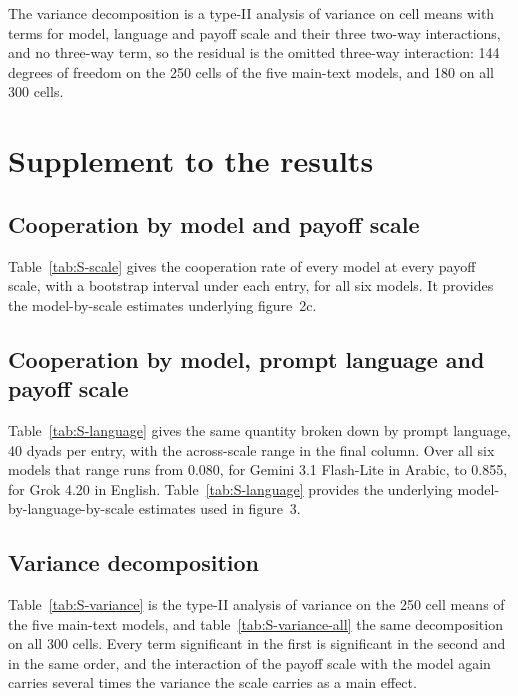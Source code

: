 \documentclass[11pt,a4paper]{article}
\begin{document}
The variance decomposition is a type-II analysis of variance on cell means with terms for model, language and payoff scale and their three two-way interactions, and no three-way term, so the residual is the omitted three-way interaction: 144 degrees of freedom on the 250 cells of the five main-text models, and 180 on all 300 cells.


\section{Supplement to the results}\label{appendix:results}

\subsection{Cooperation by model and payoff scale}\label{appendix:by_scale}

Table~\ref{tab:S-scale} gives the cooperation rate of every model at every payoff scale, with a bootstrap interval under each entry, for all six models. It provides the model-by-scale estimates underlying figure~2c.

\subsection{Cooperation by model, prompt language and payoff scale}\label{appendix:by_language}

Table~\ref{tab:S-language} gives the same quantity broken down by prompt language, 40 dyads per entry, with the across-scale range in the final column. Over all six models that range runs from 0.080, for Gemini 3.1 Flash-Lite in Arabic, to 0.855, for Grok 4.20 in English. Table~\ref{tab:S-language} provides the underlying model-by-language-by-scale estimates used in figure~3.

\subsection{Variance decomposition}\label{appendix:variance}

Table~\ref{tab:S-variance} is the type-II analysis of variance on the 250 cell means of the five main-text models, and table~\ref{tab:S-variance-all} the same decomposition on all 300 cells. Every term significant in the first is significant in the second and in the same order, and the interaction of the payoff scale with the model again carries several times the variance the scale carries as a main effect.
\end{document}
